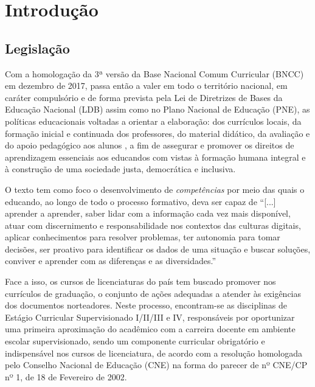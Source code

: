 
\chapter{Introdução}
\section{Legislação}
Com a homologação da 3ª versão da Base Nacional Comum Curricular (BNCC) em dezembro de 2017, passa então a valer em todo o território nacional, em caráter compulsório e de forma prevista pela Lei de Diretrizes de Bases da Educação Nacional (LDB) assim como no Plano Nacional de Educação (PNE), as políticas educacionais voltadas a orientar a elaboração: dos currículos locais, da formação inicial e continuada dos professores, do material didático, da avaliação e do apoio pedagógico aos alunos \cite{BRASIL:2017}, a fim de assegurar e promover os direitos de aprendizagem essenciais aos educandos com vistas à formação humana integral e à construção de uma sociedade justa, democrática e inclusiva.

O texto tem como foco o desenvolvimento de \emph{competências} por meio das quais o educando, ao longo de todo o processo formativo, deva ser capaz de \cite[p. 14]{BRASIL:2017} ``[...] aprender a aprender, saber lidar com a informação cada vez mais disponível, atuar com discernimento e responsabilidade nos contextos das culturas digitais, aplicar conhecimentos para resolver problemas, ter autonomia para tomar decisões, ser proativo para identificar os dados de uma situação e buscar soluções, conviver e aprender com as diferenças e as diversidades.'' 

Face a isso, os cursos de licenciaturas do país tem buscado promover nos currículos de graduação, o conjunto de ações adequadas a atender às exigências dos documentos norteadores. Neste processo, encontram-se as disciplinas de Estágio Curricular Supervisionado I/II/III e IV, responsáveis por oportunizar uma primeira aproximação do acadêmico com a carreira docente em ambiente escolar supervisionado, sendo um componente curricular obrigatório e indispensável nos cursos de licenciatura, de acordo com a resolução \cite{BRASIL:2002a} homologada pelo Conselho Nacional de Educação (CNE) na forma do parecer de nº  CNE/CP nº 1, de 18 de Fevereiro de 2002.

